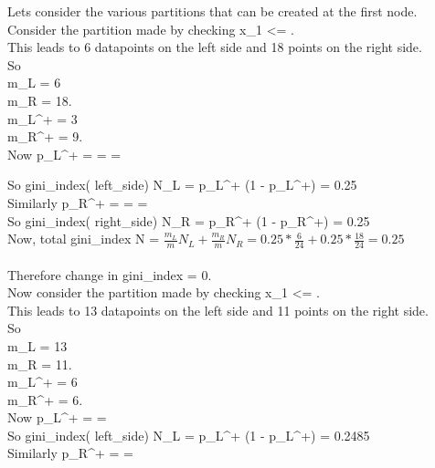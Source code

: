 \documentclass[twoside,10pt,a4paper]{article}
\theoremstyle{definition}
\theoremstyle{definition}
\theoremstyle{remark}
\renewcommand{\>}{{\rightarrow}}
\newcommand{\1}{{\mathbf 1}}
\newcommand{\0}{{\mathbf 0}}
\begin{document}
Lets consider the various partitions that can be created at the first node.\\

Consider the partition made by checking x_1 <= .\\

This leads to 6 datapoints on the left side and 18 points on the right side.\\

So \\
m_L = 6 \\
m_R = 18.\\
m_L^+ = 3 \\
m_R^+ = 9.\\

Now
p_L^+ =  =  = 

So
gini\_index( left\_side) N_L = p_L^+ (1 - p_L^+) = 0.25\\

Similarly
p_R^+ =  =  =  \\

So
gini\_index( right\_side) N_R = p_R^+ (1 - p_R^+) = 0.25\\

Now, total gini\_index N = $\frac{ m_L }{ m } N_L + \frac{m_R}{m} N_R = 0.25 * \frac{6}{24} + 0.25 * \frac{18}{24} = 0.25$\\ ~\\

Therefore change in gini\_index = 0.\\

Now consider the partition made by checking x_1 <= .\\

This leads to 13 datapoints on the left side and 11 points on the right side.\\

So \\
m_L = 13 \\
m_R = 11.\\
m_L^+ = 6 \\
m_R^+ = 6.\\

Now
p_L^+ =  =  \\

So
gini\_index( left\_side) N_L = p_L^+ (1 - p_L^+) = 0.2485\\

Similarly
p_R^+ =  =  \\
\end{document}
